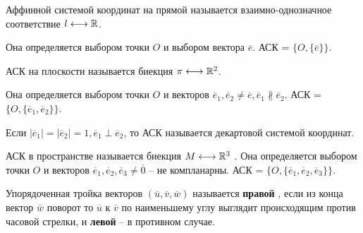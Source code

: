 


	\Header

	\BeginConspect


	

	\begin{Def}
		Аффинной системой координат на прямой называется взаимно-однозначное соответствие $l \longleftrightarrow \mathbb{R}$. \\
		
		\begin{figure*}[h]
			\centering
			\def\svgwidth{0.3\columnwidth}
			
		\end{figure*}
		
		Она определяется выбором точки $O$  и выбором вектора $\overline{e}$. АСК = $\{O, \{\overline{e}\}\}$.
	\end{Def}

	\begin{Def}
		АСК на плоскости называется биекция $\pi \longleftrightarrow \mathbb{R}^2$. 

		\begin{figure*}[h]
			\centering
			\def\svgwidth{0.3\columnwidth}
			
		\end{figure*}

		Она определяется выбором точки $O$ и векторов $\overline{e}_1, \overline{e}_2 \neq \overline{e}, \overline{e}_1 \not\parallel \overline{e}_2$. 
		АСК = $\{O, \{\overline{e}_1, \overline{e}_2\}\}$.
	\end{Def}

	\begin{Def}
		Если $|\overline{e}_1| = |\overline{e}_2| = 1, \overline{e}_1 \perp \overline{e}_2$, то АСК называется декартовой системой координат. 
	\end{Def}

	\begin{Def}
		АСК в пространстве называется биекция $M \longleftrightarrow \mathbb{R}^3$ .
		Она определяется выбором точки $O$ и векторов $\overline{e}_1, \overline{e}_2, \overline{e}_3 \neq \overline{0}$ -- не компланарны. АСК = $\{O, \{\overline{e}_1, \overline{e}_2, \overline{e}_3\}\}$.
	\end{Def}

	\begin{Def}
		Упорядоченная тройка векторов $(\overline{u}, \overline{v}, \overline{w})$ называется \textbf{правой} , 
		если из конца вектор $\overline{w}$ поворот то $\overline{u}$ к $\overline{v}$ по наименьшему углу выглядит происходящим против часовой стрелки,
		и \textbf{левой} -- в противном случае. 
	\end{Def}

